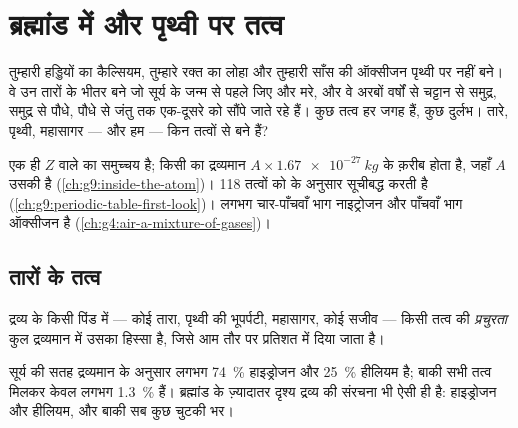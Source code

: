 \chapter{ब्रह्मांड में और पृथ्वी पर तत्व}\label{ch:g9:elements-universe-earth}

तुम्हारी हड्डियों का कैल्सियम, तुम्हारे रक्त का लोहा और तुम्हारी साँस की ऑक्सीजन
पृथ्वी पर नहीं बने। वे उन तारों के भीतर बने जो सूर्य के जन्म से पहले जिए और मरे,
और वे अरबों वर्षों से चट्टान से समुद्र, समुद्र से पौधे, पौधे से जंतु तक एक-दूसरे
को सौंपे जाते रहे हैं। कुछ तत्व हर जगह हैं, कुछ दुर्लभ। तारे, पृथ्वी, महासागर
--- और हम --- किन तत्वों से बने हैं?

\begin{recall}
 एक ही  $Z$ वाले  का समुच्चय है; किसी
 का द्रव्यमान $A \times \qty{1.67e-27}{kg}$ के क़रीब होता है, जहाँ $A$
उसकी  है (\cref{ch:g9:inside-the-atom})।  118
तत्वों को  के अनुसार सूचीबद्ध करती है
(\cref{ch:g9:periodic-table-first-look})।  लगभग चार-पाँचवाँ भाग नाइट्रोजन
और पाँचवाँ भाग ऑक्सीजन है (\cref{ch:g4:air-a-mixture-of-gases})।
\end{recall}

\section{तारों के तत्व}

\begin{definition}[प्रचुरता]\label{def:g9:elements-universe-earth:abundance}
द्रव्य के किसी पिंड में --- कोई तारा, पृथ्वी की भूपर्पटी, महासागर, कोई सजीव ---
किसी तत्व की \emph{प्रचुरता} कुल द्रव्यमान में उसका
हिस्सा है, जिसे आम तौर पर प्रतिशत में दिया जाता है।
\end{definition}

\begin{proposition}[सूर्य हाइड्रोजन और हीलियम है]\label{prop:g9:elements-universe-earth:sun}
सूर्य की सतह द्रव्यमान के अनुसार लगभग \qty{74}{\percent} हाइड्रोजन
और \qty{25}{\percent} हीलियम है; बाकी सभी तत्व मिलकर केवल लगभग
\qty{1.3}{\percent} हैं। ब्रह्मांड के ज़्यादातर दृश्य द्रव्य की संरचना भी ऐसी ही
है: हाइड्रोजन और हीलियम, और बाकी सब कुछ चुटकी भर।
\end{proposition}

